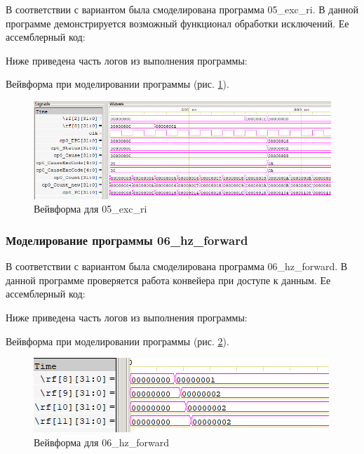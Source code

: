 \documentclass[a4paper,14pt]{article}
\begin{document}
	В соответствии с вариантом была смоделирована программа  05\_exc\_ri.
	В данной программе демонстрируется возможный функционал обработки исключений.
	Ее ассемблерный код:
	
	{\small {}}
	
	Ниже приведена часть логов из выполнения программы:
	
	{\small {}}
	
	Вейвформа при моделировании программы (рис. \ref{fig:0405wvf}).
	
	\begin{figure}[H]
		\centering
		\includegraphics[width=0.95\linewidth]{images/04_05_wvf}
		\caption{Вейвформа для  05\_exc\_ri}
		\label{fig:0405wvf}
	\end{figure}
		
		
	\subsubsection{Моделирование программы 06\_hz\_forward}
	
	В соответствии с вариантом была смоделирована программа 06\_hz\_forward.
	В данной программе проверяется работа конвейера при доступе к данным.
	Ее ассемблерный код:
	
	{\small {}}
	
	Ниже приведена часть логов из выполнения программы:
	
	{\small {}}
	
	Вейвформа при моделировании программы (рис. \ref{fig:0406wvf}).
	
	\begin{figure}[H]
		\centering
		\includegraphics[width=0.7\linewidth]{images/04_06_wvf}
		\caption{Вейвформа для  06\_hz\_forward}
		\label{fig:0406wvf}
	\end{figure}
\end{document}

